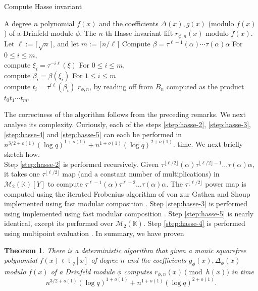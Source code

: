 \documentclass{article}
\theoremstyle{plain}
\newtheorem{theorem}{Theorem}
\theoremstyle{definition}
\def\F{\ensuremath{\mathbb{F}}}
\def\K{\ensuremath{\mathbb{K}}}
\begin{document}
\begin{algorithm}[H]
	\caption{Compute Hasse invariant}
	\label{alg:hasse-inv}
	\begin{algorithmic}[1]
		\REQUIRE A degree $n$ polynomial $f(x)$ and the coefficients $\Delta(x), g(x)$ (modulo $f(x)$) of a Drinfeld module $\phi$.
		\ENSURE The $n$-th Hasse invariant lift $r_{\phi,n}(x)$ modulo $f(x)$.
		\STATE Let $\ell := \lceil \sqrt{n} \rceil$, and let $m := \lceil n / \ell \rceil$
		\STATE\label{step:hasse-2}
		Compute $\beta = \tau^{\ell-1}(\alpha) \cdots \tau(\alpha) \alpha$
		\STATE\label{step:hasse-3}
		For $0 \le i \le m$, \\
		compute $\xi_i = \tau^{-i\ell}(\xi)$
		\STATE\label{step:hasse-4}
		For $0 \le i \le m$, \\
		compute $\beta_i = \beta(\xi_i)$
		\STATE\label{step:hasse-5}
		For $1 \le i \le m$ \\
		compute $t_i = \tau^{i\ell}(\beta_i)$
		\RETURN $r_{\phi,n}$, by reading off from $B_n$ computed as the product $t_0t_1 \cdots t_m$.
	\end{algorithmic}
\end{algorithm}

\noindent The correctness of the algorithm follows from the preceding remarks. We next analyse its complexity. Curiously, each of the steps \ref{step:hasse-2}, \ref{step:hasse-3},  \ref{step:hasse-4} and \ref{step:hasse-5} can each be performed in $n^{3/2+o(1)} (\log q)^{1+o(1)} + n^{1+o(1)} (\log q)^{2+o(1)}$. time. We next briefly sketch how.\\ 

\noindent Step \ref{step:hasse-2} is performed recursively. Given $\tau^{\lfloor\ell/2\rfloor}(\alpha)\tau^{\lfloor\ell/2\rfloor-1}\ldots\tau(\alpha) \alpha$, it takes one $\tau^{\lfloor\ell/2\rfloor}$ map (and a constant number of multiplications) in $\mathscr{M}_2(\K)[Y]$ to compute $\tau^{\ell-1}(\alpha)\tau^{\ell-2}\ldots\tau(\alpha)\alpha$. The $\tau^{\lfloor\ell/2\rfloor}$ power map is computed using the iterated Frobenius algorithm of von zur Gathen and Shoup \cite{gs} implemented using fast modular composition \cite{ku}. Step \ref{step:hasse-3} is performed using \cite[Lemma 3]{ks} implemented using fast modular composition \cite{ku}. Step \ref{step:hasse-5} is nearly identical, except its performed over $\mathscr{M}_2(\K)$. Step \ref{step:hasse-4} is performed using multipoint evaluation \cite{vzGG}. In summary, we have proven 
\begin{theorem}
	\label{theo:hasse-inv}
	There is a deterministic algorithm that given a monic squarefree polynomial $f(x) \in \F_q[x]$ of degree $n$ and the coefficients $g_\phi(x),\Delta_{\phi}(x)$ modulo $f(x)$ of a Drinfeld module $\phi$ computes $r_{\phi,n}(x) \pmod {h(x)}$ in time
	\[n^{3/2+o(1)} (\log q)^{1+o(1)} + n^{1+o(1)} (\log q)^{2+o(1)}.\]
\end{theorem}
\end{document}
